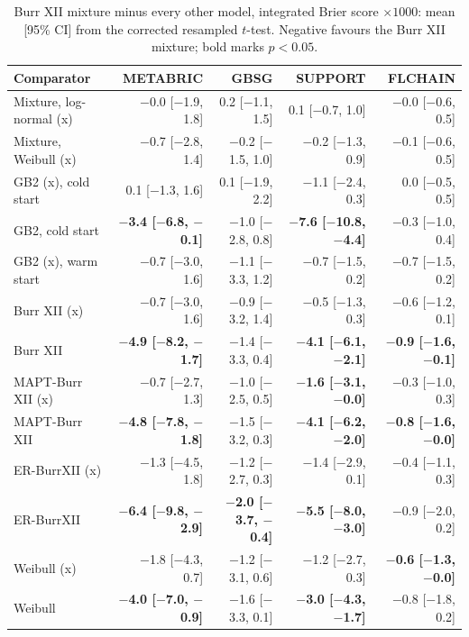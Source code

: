 \begin{table}[htbp]
\centering
\caption{Burr XII mixture minus every other model, integrated Brier score $\times 1000$: mean [95\% CI] from the corrected resampled $t$-test. Negative favours the Burr XII mixture; bold marks $p < 0.05$.}\label{stab:tests}
\scriptsize
\begin{tabular}{lrrrr}
\toprule
Comparator & METABRIC & GBSG & SUPPORT & FLCHAIN \\
\midrule
Mixture, log-normal (x) & $-$0.0 [$-$1.9, 1.8] & 0.2 [$-$1.1, 1.5] & 0.1 [$-$0.7, 1.0] & $-$0.0 [$-$0.6, 0.5] \\
Mixture, Weibull (x) & $-$0.7 [$-$2.8, 1.4] & $-$0.2 [$-$1.5, 1.0] & $-$0.2 [$-$1.3, 0.9] & $-$0.1 [$-$0.6, 0.5] \\
GB2 (x), cold start & 0.1 [$-$1.3, 1.6] & 0.1 [$-$1.9, 2.2] & $-$1.1 [$-$2.4, 0.3] & 0.0 [$-$0.5, 0.5] \\
GB2, cold start & \textbf{$-$3.4 [$-$6.8, $-$0.1]} & $-$1.0 [$-$2.8, 0.8] & \textbf{$-$7.6 [$-$10.8, $-$4.4]} & $-$0.3 [$-$1.0, 0.4] \\
GB2 (x), warm start & $-$0.7 [$-$3.0, 1.6] & $-$1.1 [$-$3.3, 1.2] & $-$0.7 [$-$1.5, 0.2] & $-$0.7 [$-$1.5, 0.2] \\
Burr XII (x) & $-$0.7 [$-$3.0, 1.6] & $-$0.9 [$-$3.2, 1.4] & $-$0.5 [$-$1.3, 0.3] & $-$0.6 [$-$1.2, 0.1] \\
Burr XII & \textbf{$-$4.9 [$-$8.2, $-$1.7]} & $-$1.4 [$-$3.3, 0.4] & \textbf{$-$4.1 [$-$6.1, $-$2.1]} & \textbf{$-$0.9 [$-$1.6, $-$0.1]} \\
MAPT-Burr XII (x) & $-$0.7 [$-$2.7, 1.3] & $-$1.0 [$-$2.5, 0.5] & \textbf{$-$1.6 [$-$3.1, $-$0.0]} & $-$0.3 [$-$1.0, 0.3] \\
MAPT-Burr XII & \textbf{$-$4.8 [$-$7.8, $-$1.8]} & $-$1.5 [$-$3.2, 0.3] & \textbf{$-$4.1 [$-$6.2, $-$2.0]} & \textbf{$-$0.8 [$-$1.6, $-$0.0]} \\
ER-BurrXII (x) & $-$1.3 [$-$4.5, 1.8] & $-$1.2 [$-$2.7, 0.3] & $-$1.4 [$-$2.9, 0.1] & $-$0.4 [$-$1.1, 0.3] \\
ER-BurrXII & \textbf{$-$6.4 [$-$9.8, $-$2.9]} & \textbf{$-$2.0 [$-$3.7, $-$0.4]} & \textbf{$-$5.5 [$-$8.0, $-$3.0]} & $-$0.9 [$-$2.0, 0.2] \\
Weibull (x) & $-$1.8 [$-$4.3, 0.7] & $-$1.2 [$-$3.1, 0.6] & $-$1.2 [$-$2.7, 0.3] & \textbf{$-$0.6 [$-$1.3, $-$0.0]} \\
Weibull & \textbf{$-$4.0 [$-$7.0, $-$0.9]} & $-$1.6 [$-$3.3, 0.1] & \textbf{$-$3.0 [$-$4.3, $-$1.7]} & $-$0.8 [$-$1.8, 0.2] \\

\end{tabular}
\end{table}
